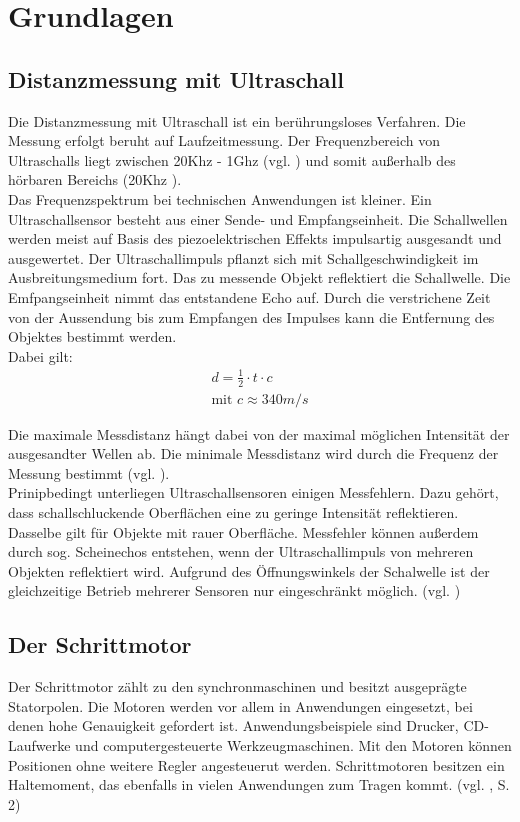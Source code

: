 \chapter{Grundlagen}
\section{Distanzmessung mit Ultraschall}
Die Distanzmessung mit Ultraschall ist ein berührungsloses Verfahren. Die Messung erfolgt beruht auf Laufzeitmessung. Der Frequenzbereich von Ultraschalls liegt zwischen 20Khz - 1Ghz (vgl. \cite{ultraschallbereich}) und somit außerhalb des hörbaren Bereichs (20Khz ). \\ Das Frequenzspektrum bei technischen Anwendungen ist kleiner. 
Ein Ultraschallsensor besteht aus einer Sende- und Empfangseinheit. Die Schallwellen werden meist auf Basis des piezoelektrischen Effekts impulsartig ausgesandt und ausgewertet.  Der Ultraschallimpuls pflanzt sich mit Schallgeschwindigkeit im Ausbreitungsmedium fort. Das zu messende Objekt reflektiert die Schallwelle. Die Emfpangseinheit nimmt das entstandene Echo auf. Durch die verstrichene Zeit von der Aussendung bis zum Empfangen des Impulses kann die Entfernung des Objektes bestimmt werden. \\

Dabei gilt:
\begin{align}
d = \frac{1}{2} \cdot t\cdot c\\
\text{mit }  c \approx 340m/s 
\end{align}

Die maximale Messdistanz hängt dabei von der maximal möglichen Intensität der ausgesandter Wellen ab. Die minimale Messdistanz wird durch die Frequenz der Messung bestimmt (vgl. \cite{ultraschallUni}). \\
Prinipbedingt unterliegen Ultraschallsensoren einigen Messfehlern. Dazu gehört, dass schallschluckende Oberflächen eine zu geringe Intensität reflektieren. Dasselbe gilt für Objekte mit rauer Oberfläche. Messfehler können außerdem durch sog. Scheinechos entstehen, wenn der Ultraschallimpuls von mehreren Objekten reflektiert wird. Aufgrund des Öffnungswinkels der Schalwelle ist der gleichzeitige Betrieb mehrerer Sensoren nur	 eingeschränkt möglich. (vgl. \cite{ultraschallBa})

\newpage
\section{Der Schrittmotor}
Der Schrittmotor zählt zu den \acrshort{synchronmaschine}n und besitzt ausgeprägte Statorpolen. Die Motoren werden vor allem in Anwendungen eingesetzt, bei denen hohe Genauigkeit gefordert ist. Anwendungsbeispiele sind Drucker, CD-Laufwerke und computergesteuerte Werkzeugmaschinen. Mit den Motoren können Positionen ohne weitere Regler angesteuerut werden. Schrittmotoren besitzen ein Haltemoment, das ebenfalls in vielen Anwendungen zum Tragen kommt. (vgl. \cite{schrittmotorBa}, S. 2)\\


